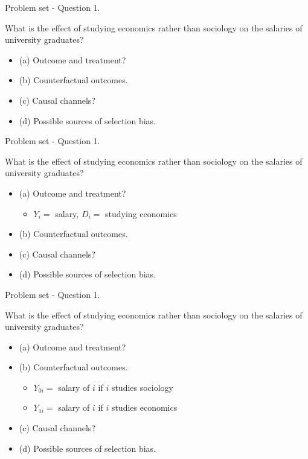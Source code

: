 \documentclass[aspectratio=169, 11pt]{beamer}
\begin{document}
\begin{frame}{Problem set - Question 1.}

What is the effect of studying economics rather than sociology on the salaries of university graduates?

\begin{itemize}
    \item (a) Outcome and treatment?
    \item (b) Counterfactual outcomes.
    \item (c) Causal channels?
    \item (d) Possible sources of selection bias.
\end{itemize}
\end{frame}

\begin{frame}{Problem set - Question 1.}

What is the effect of studying economics rather than sociology on the salaries of university graduates?

\begin{itemize}
    \item (a) \alert{Outcome and treatment?}
    \begin{itemize}
        \item \alert{$Y_i =$ salary, $D_i=$ studying economics}
    \end{itemize}
    \item (b) Counterfactual outcomes.
    \item (c) Causal channels?
    \item (d) Possible sources of selection bias.
\end{itemize}
\end{frame}

\begin{frame}{Problem set - Question 1.}

What is the effect of studying economics rather than sociology on the salaries of university graduates?

\begin{itemize}
    \item (a) Outcome and treatment?
    \item \alert{(b) Counterfactual outcomes.}
    \begin{itemize}
        \item \alert{$Y_{0i} =$ salary of $i$ if $i$ studies sociology}
        \item \alert{$Y_{1i} =$ salary of $i$ if $i$ studies economics}
    \end{itemize}
    \item (c) Causal channels?
    \item (d) Possible sources of selection bias.
\end{itemize}
\end{frame}
\end{document}
